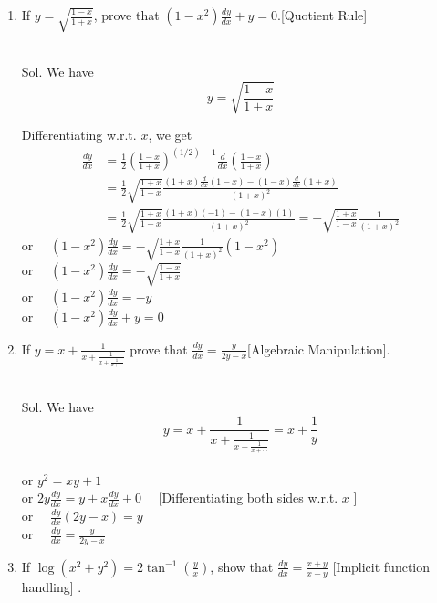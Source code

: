 \begin{enumerate}
\item If $y=\sqrt{\frac{1-x}{1+x}}$, prove that $\left(1-x^2\right) \frac{d y}{d x}+y=0$.[Quotient Rule]\\\\


\begin{outline}
    Sol. We have
$$
y=\sqrt{\frac{1-x}{1+x}}
$$

Differentiating w.r.t. $x$, we get
$$
\begin{aligned}
\frac{d y}{d x} & =\frac{1}{2}\left(\frac{1-x}{1+x}\right)^{(1 / 2)-1} \frac{d}{d x}\left(\frac{1-x}{1+x}\right) \\
& =\frac{1}{2} \sqrt{\frac{1+x}{1-x}} \frac{(1+x) \frac{d}{d x}(1-x)-(1-x) \frac{d}{d x}(1+x)}{(1+x)^2} \\
& =\frac{1}{2} \sqrt{\frac{1+x}{1-x}} \frac{(1+x)(-1)-(1-x)(1)}{(1+x)^2}=-\sqrt{\frac{1+x}{1-x}} \frac{1}{(1+x)^2}
\end{aligned}
$$
or $\quad\left(1-x^2\right) \frac{d y}{d x}=-\sqrt{\frac{1+x}{1-x}} \frac{1}{(1+x)^2}\left(1-x^2\right)$\\
or $\quad\left(1-x^2\right) \frac{d y}{d x}=-\sqrt{\frac{1-x}{1+x}}$\\
or $\quad\left(1-x^2\right) \frac{d y}{d x}=-y$\\
or $\quad\left(1-x^2\right) \frac{d y}{d x}+y=0$\\

\end{outline}


\item If $y=x+\frac{1}{x+\frac{1}{x+\frac{1}{x+\cdots}}}$ prove that $\frac{d y}{d x}=\frac{y}{2 y-x}$[Algebraic Manipulation].\\\\


\begin{outline}
    Sol. We have
$$
y=x+\frac{1}{x+\frac{1}{x+\frac{1}{x+\cdots}}}=x+\frac{1}{y}
$$\\
or $y^2=x y+1$\\
or $2 y \frac{d y}{d x}=y+x \frac{d y}{d x}+0 \quad$ [Differentiating both sides w.r.t. $x$ ]\\
or $\quad \frac{d y}{d x}(2 y-x)=y$\\
or $\quad \frac{d y}{d x}=\frac{y}{2 y-x}$\\
\end{outline}

\newpage
\item If $\log \left(x^2+y^2\right)=2 \tan ^{-1}\left(\frac{y}{x}\right)$, show that $\frac{d y}{d x}=\frac{x+y}{x-y}$ [Implicit function handling]  .\\\\


\end{enumerate}
